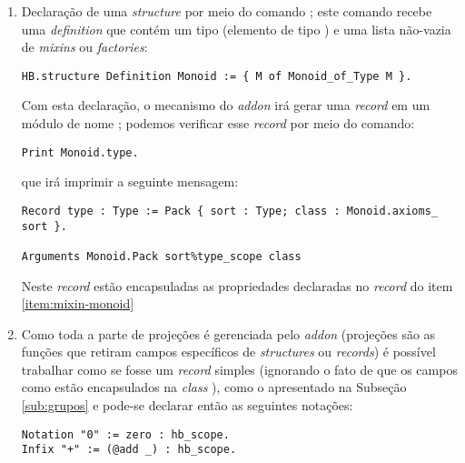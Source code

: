{{\begin{enumerate}
        \item Declaração de uma \textit{structure} por meio do comando ; este comando recebe uma \textit{definition} que contém um tipo (elemento de tipo ) e uma lista não-vazia de \textit{mixins} ou \textit{factories}:
            \begin{lstlisting}[language=coq, frame=single, tabsize=1]
HB.structure Definition Monoid := { M of Monoid_of_Type M }.
            \end{lstlisting}
        Com esta declaração, o mecanismo do \textit{addon}  irá gerar uma \textit{record} em um módulo de nome ; podemos verificar esse \textit{record} por meio do comando:
            \begin{lstlisting}[language=coq, frame=single, tabsize=1]
Print Monoid.type.   
            \end{lstlisting}
        que irá imprimir a seguinte mensagem:
            \begin{lstlisting}[language=coq-error, frame=single, tabsize=1]
Record type : Type := Pack { sort : Type; class : Monoid.axioms_ sort }.

Arguments Monoid.Pack sort%type_scope class
            \end{lstlisting}
        Neste \textit{record} estão encapsuladas as propriedades declaradas no \textit{record} do item \ref{item:mixin-monoid}
    
        \item Como toda a parte de projeções é gerenciada pelo \textit{addon}  (projeções são as funções que retiram campos específicos de \textit{structures} ou \textit{records}) é possível trabalhar como se  fosse um \textit{record} simples (ignorando o fato de que os campos como  estão encapsulados na \textit{class} ), como o apresentado na Subseção \ref{sub:grupos} e pode-se declarar então as seguintes notações:
            \begin{lstlisting}[language=coq, frame=single, tabsize=1]
Notation "0" := zero : hb_scope.
Infix "+" := (@add _) : hb_scope.
            \end{lstlisting}


\end{enumerate}}}
